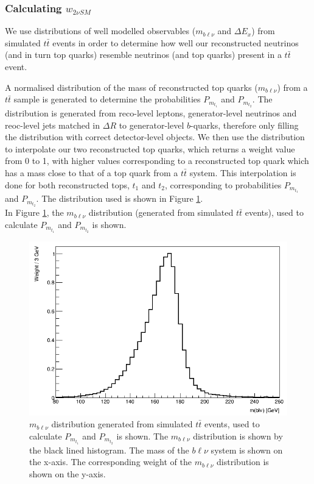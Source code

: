 \subsubsection{Calculating $w_{2\nu SM}$}
We use distributions of well modelled observables ($m_{b\ell\nu}$ and $\Delta E_{x}$) from simulated $t\bar{t}$ events in order to determine how well our reconstructed neutrinos (and in turn top quarks) resemble neutrinos (and top quarks) present in a $t\bar{t}$ event.

A normalised distribution of the mass of reconstructed top quarks ($m_{b\ell\nu}$) from a $t\bar{t}$ sample is generated to determine the probabilities $P_{m_{t_{1}}}$ and $P_{m_{t_{2}}}$. The distribution is generated from reco-level leptons, generator-level neutrinos and reoc-level jets matched in $\Delta R$ to generator-level $b$-quarks, therefore only filling the distribution with correct detector-level objects. We then use the distribution to interpolate our two reconstructed top quarks, which returns a weight value from 0 to 1, with higher values corresponding to a reconstructed top quark which has a mass close to that of a top quark from a $t\bar{t}$ system. This interpolation is done for both reconstructed tops, $t_{1}$ and $t_{2}$, corresponding to probabilities $P_{m_{t_{1}}}$ and $P_{m_{t_{2}}}$. The distribution used is shown in Figure \ref{fig:2vSM-mass-dist}.\\

In Figure \ref{fig:2vSM-mass-dist}, the $m_{b\ell\nu}$ distribution (generated from simulated $t\bar{t}$ events), used to calculate $P_{m_{t_{1}}}$ and $P_{m_{t_{2}}}$ is shown.

\begin{figure}[h!]
	\includegraphics[width=0.45\linewidth]{figures/mtop_2vSM.png}
	\centering
	\caption{$m_{b\ell\nu}$ distribution generated from simulated $t\bar{t}$ events, used to calculate $P_{m_{t_{1}}}$ and $P_{m_{t_{2}}}$ is shown. The $m_{b\ell\nu}$ distribution is shown by the black lined histogram. The mass of the $b\ell\nu$ system is shown on the x-axis. The corresponding weight of the $m_{b\ell\nu}$ distribution is shown on the y-axis.}
	\label{fig:2vSM-mass-dist}
\end{figure}

